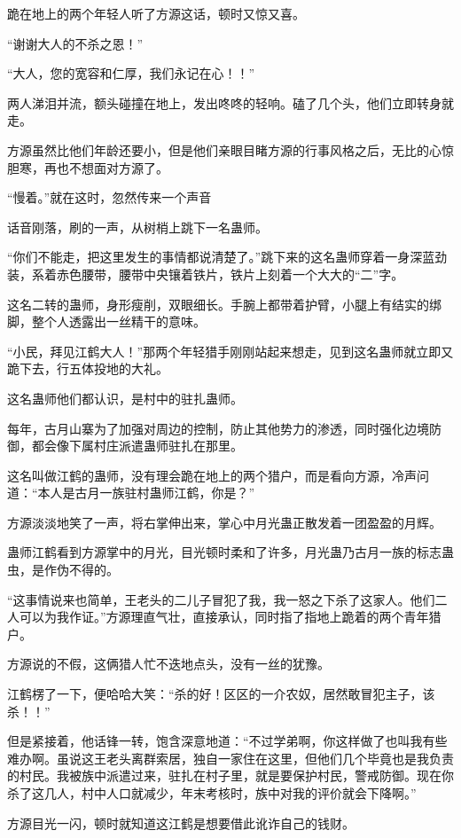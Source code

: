 \begin{this_body}
跪在地上的两个年轻人听了方源这话，顿时又惊又喜。

“谢谢大人的不杀之恩！”

“大人，您的宽容和仁厚，我们永记在心！！”

两人涕泪并流，额头碰撞在地上，发出咚咚的轻响。磕了几个头，他们立即转身就走。

方源虽然比他们年龄还要小，但是他们亲眼目睹方源的行事风格之后，无比的心惊胆寒，再也不想面对方源了。

“慢着。”就在这时，忽然传来一个声音

话音刚落，刷的一声，从树梢上跳下一名蛊师。

“你们不能走，把这里发生的事情都说清楚了。”跳下来的这名蛊师穿着一身深蓝劲装，系着赤色腰带，腰带中央镶着铁片，铁片上刻着一个大大的“二”字。

这名二转的蛊师，身形瘦削，双眼细长。手腕上都带着护臂，小腿上有结实的绑脚，整个人透露出一丝精干的意味。

“小民，拜见江鹤大人！”那两个年轻猎手刚刚站起来想走，见到这名蛊师就立即又跪下去，行五体投地的大礼。

这名蛊师他们都认识，是村中的驻扎蛊师。

每年，古月山寨为了加强对周边的控制，防止其他势力的渗透，同时强化边境防御，都会像下属村庄派遣蛊师驻扎在那里。

这名叫做江鹤的蛊师，没有理会跪在地上的两个猎户，而是看向方源，冷声问道：“本人是古月一族驻村蛊师江鹤，你是？”

方源淡淡地笑了一声，将右掌伸出来，掌心中月光蛊正散发着一团盈盈的月辉。

蛊师江鹤看到方源掌中的月光，目光顿时柔和了许多，月光蛊乃古月一族的标志蛊虫，是作伪不得的。

“这事情说来也简单，王老头的二儿子冒犯了我，我一怒之下杀了这家人。他们二人可以为我作证。”方源理直气壮，直接承认，同时指了指地上跪着的两个青年猎户。

方源说的不假，这俩猎人忙不迭地点头，没有一丝的犹豫。

江鹤楞了一下，便哈哈大笑：“杀的好！区区的一介农奴，居然敢冒犯主子，该杀！！”

但是紧接着，他话锋一转，饱含深意地道：“不过学弟啊，你这样做了也叫我有些难办啊。虽说这王老头离群索居，独自一家住在这里，但他们几个毕竟也是我负责的村民。我被族中派遣过来，驻扎在村子里，就是要保护村民，警戒防御。现在你杀了这几人，村中人口就减少，年末考核时，族中对我的评价就会下降啊。”

方源目光一闪，顿时就知道这江鹤是想要借此讹诈自己的钱财。


\end{this_body}
